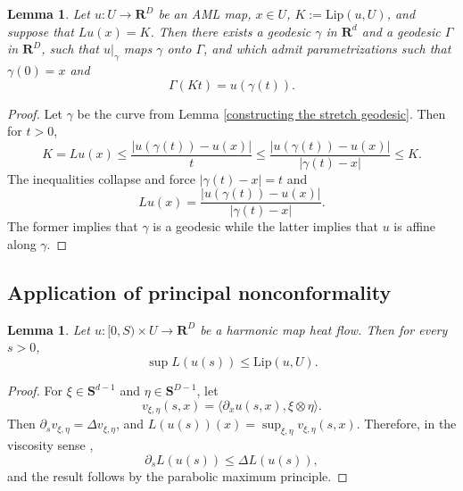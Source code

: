 \documentclass[reqno,11pt]{amsart}
\newcommand{\RR}{\mathbf{R}}
\newcommand{\Sph}{\mathbf S}
\newcommand{\Lip}{\mathrm{Lip}}
\newtheorem{lemma}[theorem]{Lemma}
\theoremstyle{definition}
\numberwithin{equation}{section}
\begin{document}
\begin{lemma}\label{geodesics still incomplete}
Let $u: U \to \RR^D$ be an AML map, $x \in U$, $K := \Lip(u, U)$, and suppose that $Lu(x) = K$.
Then there exists a geodesic $\gamma$ in $\RR^d$ and a geodesic $\Gamma$ in $\RR^D$, such that $u|_\gamma$ maps $\gamma$ onto $\Gamma$, and which admit parametrizations such that $\gamma(0) = x$ and
$$\Gamma(Kt) = u(\gamma(t)).$$
\end{lemma}
\begin{proof}
Let $\gamma$ be the curve from Lemma \ref{constructing the stretch geodesic}.
Then for $t > 0$,
$$K = Lu(x) \leq \frac{|u(\gamma(t)) - u(x)|}{t} \leq \frac{|u(\gamma(t)) - u(x)|}{|\gamma(t) - x|} \leq K.$$
The inequalities collapse and force $|\gamma(t) - x| = t$ and 
$$Lu(x) = \frac{|u(\gamma(t)) - u(x)|}{|\gamma(t) - x|}.$$
The former implies that $\gamma$ is a geodesic while the latter implies that $u$ is affine along $\gamma$.
\end{proof}

\subsection{Application of principal nonconformality}
\begin{lemma}\label{Lipschitz maximum principle}
Let $u: [0, S) \times U \to \RR^D$ be a harmonic map heat flow.
Then for every $s > 0$,
$$\sup L(u(s)) \leq \Lip(u, U).$$
\end{lemma}
\begin{proof}
For $\xi \in \Sph^{d - 1}$ and $\eta \in \Sph^{D - 1}$, let
$$v_{\xi, \eta}(s, x) = \langle \partial_x u(s, x), \xi \otimes \eta\rangle.$$
Then $\partial_s v_{\xi, \eta} = \Delta v_{\xi, \eta}$, and $L(u(s))(x) = \sup_{\xi, \eta} v_{\xi, \eta}(s, x)$.
Therefore, in the viscosity sense \cite[Lemma 4.2]{Crandall92},
$$\partial_s L(u(s)) \leq \Delta L(u(s)),$$
and the result follows by the parabolic maximum principle.
\end{proof}
\end{document}
